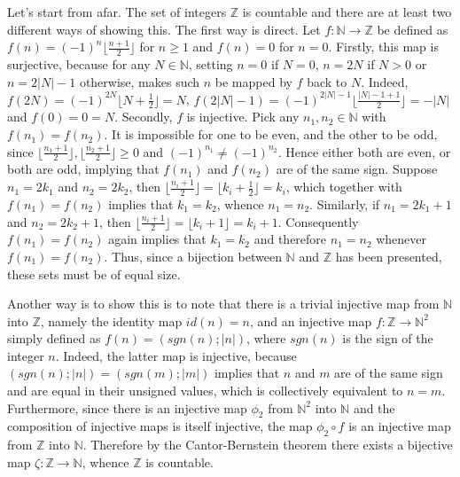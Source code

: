 \documentclass[a4paper]{article}
\begin{document}
Let's start from afar. The set of integers $\mathbb{Z}$ is countable and there are at least two different ways of showing this. The first way is direct. Let $f:\mathbb{N}\to \mathbb{Z}$ be defined as $f(n) = (-1)^n \lfloor \frac{n+1}{2}\rfloor$ for $n\geq 1$ and $f(n) = 0$ for $n=0$.
Firstly, this map is surjective, because for any $N\in\mathbb{N}$, setting $n=0$ if $N=0$, $n=2N$ if $N>0$ or $n=2|N|-1$ otherwise, makes such $n$ be mapped by $f$ back to $N$. Indeed, $f(2N) = (-1)^{2N} \lfloor N+\frac{1}{2}\rfloor = N$, $f(2|N|-1) = (-1)^{2|N|-1} \lfloor \frac{|N|-1+1}{2}\rfloor = -|N|$ and $f(0) = 0 = N$.
Secondly, $f$ is injective. Pick any $n_1, n_2\in \mathbb{N}$ with $f(n_1)=f(n_2)$. It is impossible for one to be even, and the other to be odd, since $\lfloor \frac{n_1+1}{2}\rfloor, \lfloor \frac{n_2+1}{2}\rfloor \geq 0$ and $(-1)^{n_1} \neq (-1)^{n_2}$. Hence either both are even, or both are odd, implying that $f(n_1)$ and $f(n_2)$ are of the same sign. Suppose $n_1 = 2k_1$ and $n_2 = 2k_2$, then $\lfloor \frac{n_i+1}{2}\rfloor = \lfloor k_i+\frac{1}{2}\rfloor = k_i$, which together with $f(n_1)=f(n_2)$ implies that $k_1=k_2$, whence $n_1=n_2$. Similarly, if $n_1 = 2k_1+1$ and $n_2 = 2k_2+1$, then $\lfloor \frac{n_i+1}{2}\rfloor = \lfloor k_i+1\rfloor = k_i+1$. Consequently $f(n_1)=f(n_2)$ again implies that $k_1=k_2$ and therefore $n_1 = n_2$ whenever $f(n_1)=f(n_2)$. Thus, since a bijection between $\mathbb{N}$ and $\mathbb{Z}$ has been presented, these sets must be of equal size.

Another way is to show this is to note that there is a trivial injective map from $\mathbb{N}$ into $\mathbb{Z}$, namely the identity map $id(n)=n$, and an injective map $f:\mathbb{Z}\to \mathbb{N}^2$ simply defined as $f(n) = (sgn(n);|n|)$, where $sgn(n)$ is the sign of the integer $n$. Indeed, the latter map is injective, because $(sgn(n);|n|) = (sgn(m);|m|)$ implies that $n$ and $m$ are of the same sign and are equal in their unsigned values, which is collectively equivalent to $n=m$. Furthermore, since there is an injective map $\phi_2$ from $\mathbb{N}^2$ into $\mathbb{N}$ and the composition of injective maps is itself injective, the map $\phi_2\circ f$ is an injective map from $\mathbb{Z}$ into $\mathbb{N}$. Therefore by the Cantor-Bernstein theorem there exists a bijective map $\zeta:\mathbb{Z}\to \mathbb{N}$, whence $\mathbb{Z}$ is countable.

\end{document}
